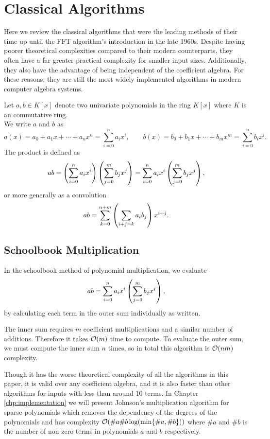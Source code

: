 \chapter{Classical Algorithms}\label{chp:classical}


Here we review the classical algorithms that were the leading methods of their time up until the FFT algorithm's introduction in the late 1960s. Despite having poorer theoretical complexities compared to their modern counterparts, they often have a far greater practical complexity for smaller input sizes. Additionally, they also have the advantage of being independent of the coefficient algebra. For these reasons, they are still the most widely implemented algorithms in modern computer algebra systems.

Let $a, b \in K[x]$ denote two univariate polynomials in the ring $K[x]$ where $K$ is an commutative ring.\\
We write $a$ and $b$ as
\[
    a(x) = a_0 + a_1x + \cdots + a_nx^n = \sum^n_{i=0} a_ix^i, \qquad b(x) = b_0 + b_1x + \cdots + b_mx^m = \sum^n_{i=0} b_ix^i.
\]
The product is defined as
\[
    ab = \left(\sum^n_{i=0} a_i x^i\right)\left(\sum^m_{j=0} b_j x^j\right) = \sum^n_{i=0} a_ix^i\left(\sum^m_{j=0} b_j x^j\right),
\]
or more generally as a convolution
\[
    ab = \sum^{n + m}_{k=0} \left(\sum_{i + j = k}a_ib_j\right) x^{i + j}.
\]

\section{Schoolbook Multiplication}
\label{sec:prelim-schoolbook}

In the schoolbook method of polynomial multiplication, we evaluate
\[
    ab = \sum^n_{i=0} a_ix^i\left(\sum^m_{j=0} b_j x^j\right),
\]
by calculating each term in the outer sum individually as written.

The inner sum requires $m$ coefficient multiplications and a similar number of additions. Therefore it takes $\mathcal O(m)$ time to compute. To evaluate the outer sum, we must compute the inner sum $n$ times, so in total this algorithm is $\mathcal O(nm)$ complexity.

Though it has the worse theoretical complexity of all the algorithms in this paper, it is valid over any coefficient algebra, and it is also faster than other algorithms for inputs with less than around $10$ terms. In Chapter \ref{chp:implementation} we will present Johnson's multiplication algorithm for sparse polynomials which removes the dependency of the degrees of the polynomials and has complexity $\mathcal O(\# a \# b \log(\min\{\# a, \# b\}))$ where $\# a$ and $\# b$ is the number of non-zero terms in polynomials $a$ and $b$ respectively.

